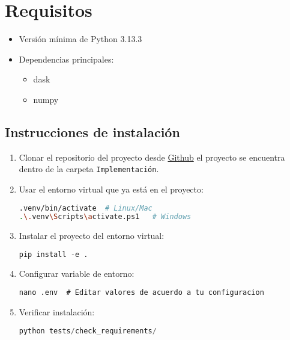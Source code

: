 	\section{Requisitos}
	\label{sec:requisitos-sistema}

	\begin{itemize}
		\item Versión mínima de Python 3.13.3
		\item Dependencias principales:
		\begin{itemize}
			\item dask
			\item numpy
		\end{itemize}
	\end{itemize}


	\subsection{Instrucciones de instalaci\'on}
	\label{sec:instalacion}

	\begin{enumerate}
		\item Clonar el repositorio del proyecto desde \href{https://github.com/Ic3manMtz/Servicio-Social.git}{Github} el proyecto se encuentra dentro de la carpeta \texttt{Implementaci\'on}.
		\item Usar el entorno virtual que ya está en el proyecto:
		\begin{lstlisting}[language=bash]
.venv/bin/activate  # Linux/Mac
.\.venv\Scripts\activate.ps1   # Windows
		\end{lstlisting}
		

		\item Instalar el proyecto del entorno virtual:
		\begin{lstlisting}[language=python]
pip install -e .
		\end{lstlisting}
		\item Configurar variable de entorno:
		\begin{lstlisting}
nano .env  # Editar valores de acuerdo a tu configuracion
		\end{lstlisting}
		\item Verificar instalaci\'on:
		\begin{lstlisting}[language=python]
python tests/check_requirements/
		\end{lstlisting}
	\end{enumerate}

